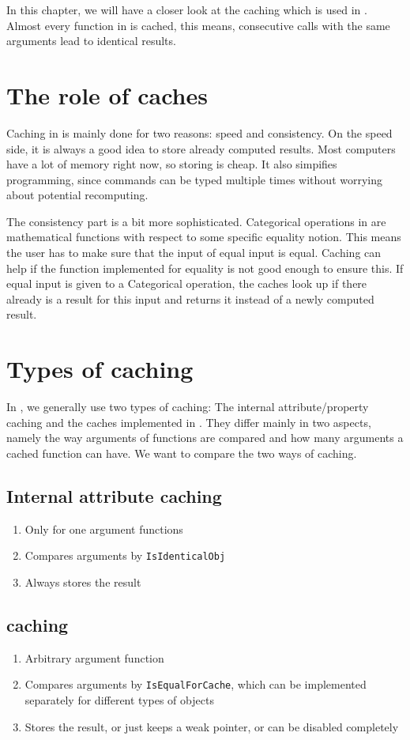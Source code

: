 In this chapter, we will have a closer look at the caching
which is used in \CapPkg. Almost every function in \CapPkg is cached,
this means, consecutive calls with the same arguments lead to identical results.

\section{The role of caches}

Caching in \CapPkg is mainly done for two reasons: speed and consistency. On the speed side, it is always
a good idea to store already computed results. Most computers have a lot of memory right now, so storing is
cheap. It also simpifies programming, since commands can be typed multiple times without worrying about potential
recomputing.

The consistency part is a bit more sophisticated. Categorical operations in \CapPkg are mathematical functions
with respect to some specific equality notion. This means the user has to make sure that the input
of equal input is equal. Caching can help if the function implemented for equality is not good enough
to ensure this. If equal input is given to a Categorical operation, the caches look up if there already
is a result for this input and returns it instead of a newly computed result.

\section{Types of caching}

In \CapPkg, we generally use two types of caching: The \GAP internal attribute/property caching and
the caches implemented in \CapPkg. They differ mainly in two aspects, namely the way arguments of
functions are compared and how many arguments a cached function can have. We want to compare the two
ways of caching.

\subsection{Internal attribute caching}
\begin{enumerate}
 \item Only for one argument functions
 \item Compares arguments by \texttt{IsIdenticalObj}
 \item Always stores the result
\end{enumerate}

\subsection{\CapPkg caching}
\begin{enumerate}
 \item Arbitrary argument function
 \item Compares arguments by \texttt{IsEqualForCache}, which can be implemented separately for different types of objects
 \item Stores the result, or just keeps a weak pointer, or can be disabled completely
\end{enumerate}

